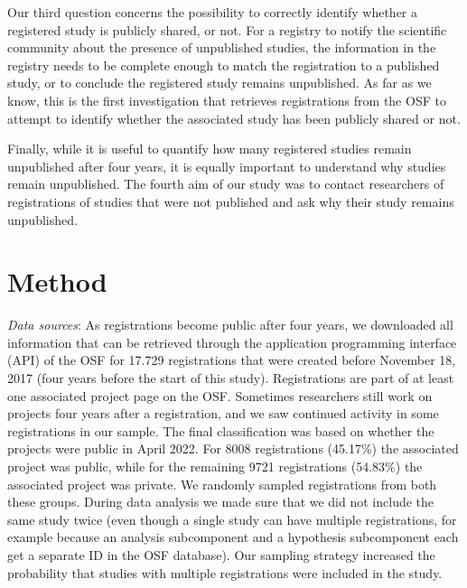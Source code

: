 \documentclass[
  ,jou, a4paper,floatsintext]{apa6}
\begin{document}
Our third question concerns the possibility to correctly identify whether a registered study is publicly shared, or not. For a registry to notify the scientific community about the presence of unpublished studies, the information in the registry needs to be complete enough to match the registration to a published study, or to conclude the registered study remains unpublished. As far as we know, this is the first investigation that retrieves registrations from the OSF to attempt to identify whether the associated study has been publicly shared or not.

Finally, while it is useful to quantify how many registered studies remain unpublished after four years, it is equally important to understand why studies remain unpublished. The fourth aim of our study was to contact researchers of registrations of studies that were not published and ask why their study remains unpublished.

\hypertarget{method}{%
\section{Method}\label{method}}

\emph{Data sources}: As registrations become public after four years, we downloaded all information that can be retrieved through the application programming interface (API) of the OSF for 17.729 registrations that were created before November 18, 2017 (four years before the start of this study). Registrations are part of at least one associated project page on the OSF. Sometimes researchers still work on projects four years after a registration, and we saw continued activity in some registrations in our sample. The final classification was based on whether the projects were public in April 2022. For 8008 registrations (45.17\%) the associated project was public, while for the remaining 9721 registrations (54.83\%) the associated project was private. We randomly sampled registrations from both these groups. During data analysis we made sure that we did not include the same study twice (even though a single study can have multiple registrations, for example because an analysis subcomponent and a hypothesis subcomponent each get a separate ID in the OSF database). Our sampling strategy increased the probability that studies with multiple registrations were included in the study.
\end{document}
